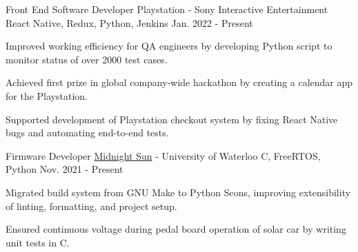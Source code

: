 

\begin{cventries}


  \cventry
    {Front End Software Developer} %
    {Playstation - Sony Interactive Entertainment} %
    {React Native, Redux, Python, Jenkins} %
    {Jan. 2022 - Present} %
    {
      \begin{cvitems} %
        \item {Improved working efficiency for QA engineers by developing Python script to monitor status of over 2000 test cases. } 
        \item {Achieved first prize in global company-wide hackathon by creating a calendar app for the Playstation. }
        \item {Supported development of Playstation checkout system by fixing React Native bugs and automating end-to-end tests.}
      \end{cvitems}
    }


  \cventry
    {Firmware Developer} %
    {\href{https://www.uwmidsun.com/}{Midnight Sun} - University of Waterloo} %
    {C, FreeRTOS, Python} %
    {Nov. 2021 - Present} %
    {
      \begin{cvitems} %
        \item {Migrated build system from GNU Make to Python Scons, improving extensibility of linting, formatting, and project setup.}
        \item {Ensured continuous voltage during pedal board operation of solar car by writing unit tests in C.}
      \end{cvitems}
    }


\end{cventries}
